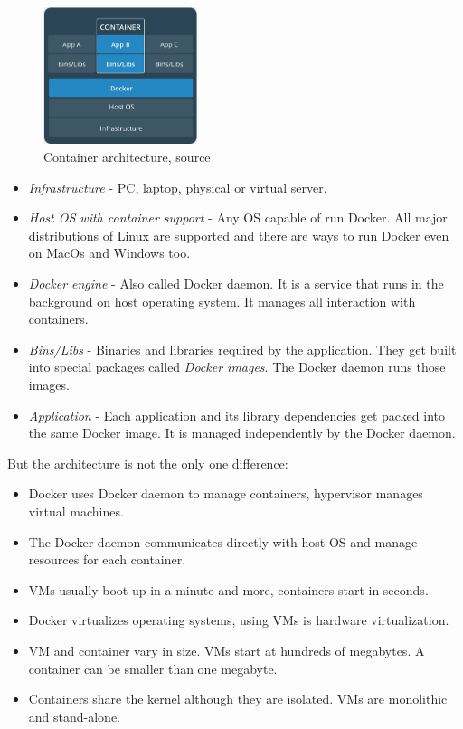 \documentclass{gifce}
\begin{document}
\begin{figure}[h!]
\centering
\includegraphics[width=0.4\textwidth]{img/Docker_container.png}
\caption{Container architecture, source \cite{Docker_docs}}
\label{fig:Docker_container}
\end{figure}

\begin{itemize}
\item \textit{Infrastructure} - PC, laptop, physical or virtual server.
\item \textit{Host OS with container support} - Any OS capable of run Docker. All major distributions of Linux are supported and there are ways
to run Docker even on MacOs and Windows too.
\item \textit{Docker engine} - Also called Docker daemon. It is a service that runs in the background on host operating system. It manages all interaction with containers.
\item \textit{Bins/Libs} - Binaries and libraries required by the application. They get built into special packages called \textit{Docker images}.
The Docker daemon runs those images.
\item \textit{Application} - Each application and its library dependencies get packed into the same Docker image. It is managed independently by the Docker daemon. 
\end{itemize}

\noindent
But the architecture is not the only one difference:
\begin{itemize}
\item Docker uses Docker daemon to manage containers, hypervisor manages virtual machines.
\item The Docker daemon communicates directly with host OS and manage resources for each container.
\item VMs usually boot up in a minute and more, containers start in seconds.
\item Docker virtualizes operating systems, using VMs is hardware virtualization.
\item VM and container vary in size. VMs start at hundreds of megabytes. A container can be smaller than one megabyte.
\item Containers share the kernel although they are isolated. VMs are monolithic and stand-alone.
\end{itemize}
\end{document}
